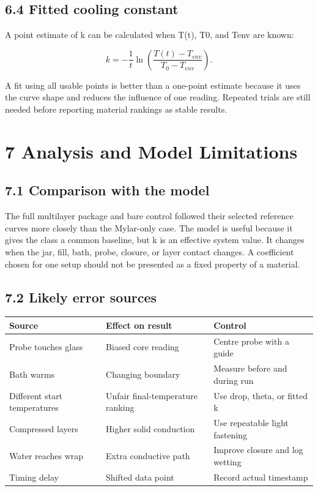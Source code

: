 \documentclass[10pt,conference,a4paper]{IEEEtran}
\begin{document}
\subsection*{6.4 Fitted cooling constant}

A point estimate of k can be calculated when T(t), T0, and Tenv are known:

\begin{equation}k=-\frac{1}{t}\ln\left(\frac{T(t)-T_{env}}{T_0-T_{env}}\right).\end{equation}

A fit using all usable points is better than a one-point estimate because it uses the curve shape and reduces the influence of one reading. Repeated trials are still needed before reporting material rankings as stable results.

\section*{7 Analysis and Model Limitations}

\subsection*{7.1 Comparison with the model}

The full multilayer package and bare control followed their selected reference curves more closely than the Mylar-only case. The model is useful because it gives the class a common baseline, but k is an effective system value. It changes when the jar, fill, bath, probe, closure, or layer contact changes. A coefficient chosen for one setup should not be presented as a fixed property of a material.

\subsection*{7.2 Likely error sources}

\begin{center}\footnotesize
\setlength{\tabcolsep}{2.5pt}
\renewcommand{\arraystretch}{1.14}
\begin{tabular}{>{\raggedright\arraybackslash}p{}>{\raggedright\arraybackslash}p{}>{\raggedright\arraybackslash}p{}}
\toprule
\textbf{Source} & \textbf{Effect on result} & \textbf{Control} \\
\midrule
Probe touches glass & Biased core reading & Centre probe with a guide \\
Bath warms & Changing boundary & Measure before and during run \\
Different start temperatures & Unfair final-temperature ranking & Use drop, theta, or fitted k \\
Compressed layers & Higher solid conduction & Use repeatable light fastening \\
Water reaches wrap & Extra conductive path & Improve closure and log wetting \\
Timing delay & Shifted data point & Record actual timestamp \\
\bottomrule
\end{tabular}
\end{center}
\end{document}
